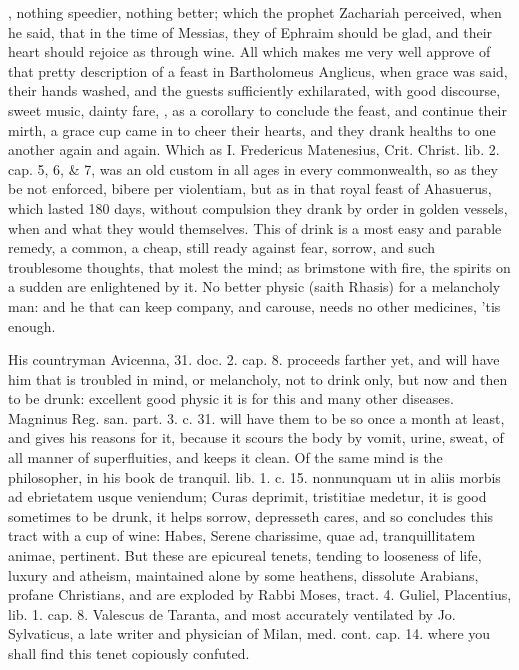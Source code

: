 , nothing
speedier, nothing better; which the prophet Zachariah perceived, when
he said, that in the time of Messias, they of Ephraim should be glad,
and their heart should rejoice as through wine. All which makes me very
well approve of that pretty description of a feast in 
Bartholomeus Anglicus, when grace was said, their hands washed, and the
guests sufficiently exhilarated, with good discourse, sweet music,
dainty fare, , as a corollary to conclude the feast, and continue their
mirth, a grace cup came in to cheer their hearts, and they drank
healths to one another again and again. Which as I. Fredericus
Matenesius, Crit. Christ. lib. 2. cap. 5, 6, \& 7, was an old custom in
all ages in every commonwealth, so as they be not enforced, bibere per
violentiam, but as in that royal feast of  Ahasuerus, which
lasted 180 days, without compulsion they drank by order in golden
vessels, when and what they would themselves. This of drink is a most
easy and parable remedy, a common, a cheap, still ready against fear,
sorrow, and such troublesome thoughts, that molest the mind; as
brimstone with fire, the spirits on a sudden are enlightened by it. No
better physic (saith Rhasis) for a melancholy man: and he that
can keep company, and carouse, needs no other medicines, 'tis enough.

His countryman Avicenna, 31. doc. 2. cap. 8. proceeds farther yet, and
will have him that is troubled in mind, or melancholy, not to drink
only, but now and then to be drunk: excellent good physic it is for
this and many other diseases. Magninus Reg. san. part. 3. c. 31. will
have them to be so once a month at least, and gives his reasons for it,
because it scours the body by vomit, urine, sweat, of all manner
of superfluities, and keeps it clean. Of the same mind is \Seneca{} the
philosopher, in his book de tranquil. lib. 1. c. 15. nonnunquam ut in
aliis morbis ad ebrietatem usque veniendum; Curas deprimit, tristitiae
medetur, it is good sometimes to be drunk, it helps sorrow, depresseth
cares, and so concludes this tract with a cup of wine: Habes, Serene
charissime, quae ad, tranquillitatem animae, pertinent. But these are
epicureal tenets, tending to looseness of life, luxury and atheism,
maintained alone by some heathens, dissolute Arabians, profane
Christians, and are exploded by Rabbi Moses, tract. 4. Guliel,
Placentius, lib. 1. cap. 8. Valescus de Taranta, and most accurately
ventilated by Jo. Sylvaticus, a late writer and physician of Milan,
med. cont. cap. 14. where you shall find this tenet copiously confuted.

